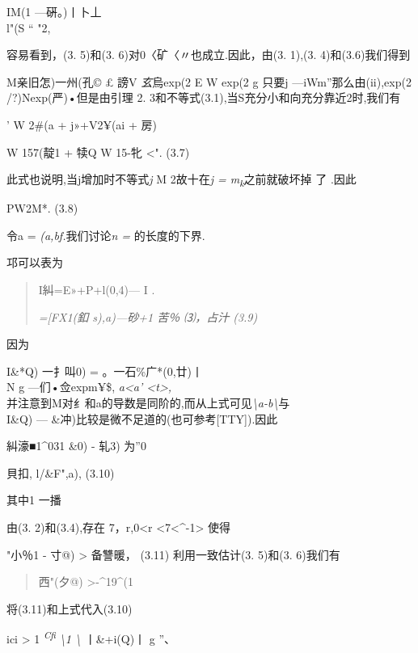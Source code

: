 {IM(1 ---硏。)丨}卜丄\\
l"(S `` "2,

容易看到，(3. 5)和(3. 6)对0〈矿〈〃也成立.因此，由(3. 1),(3.
4)和(3.6)我们得到

M亲旧怎)一州(孔©\textbar{} £ 謗V \emph{玄}烏exp(2 E W exp(2 g 只要j
---iWm''那么由(ii),exp(2 /?)Nexp(严)•但是由引理 2.
3和不等式(3.1),当S充分小和向充分靠近2时,我们有

' W 2\#(a + j»+V2¥(ai + 房)

W 157(靛1 + 犊Q W 15-牝 \textless{}". (3.7)

此式也说明,当j增加时不等式\emph{j} M 2故十在\emph{j =
m\textsubscript{k}}之前就破坏掉 了 .因此

PW2M*. (3.8)

令a = \emph{(a,bf.}我们讨论\emph{n =} 的长度的下界.

邛可以表为

\begin{quote}
I糾=\textbar{}E»+P+l(0,4)--- I .

\emph{={[}FX1(釦 s),a)---砂+1 苦％ ⑶，占汁 (3.9)}
\end{quote}

因为

I\&*Q) 一扌叫0)\textbar{} =
\textbar{}。一石\textbar{}\textbar{}\%广*(0,廿)丨\\
N g ---们•佥expm¥\$, \emph{a\textless{}a' \textless{}t\textgreater{},\\
}并注意到M对纟和a的导数是同阶的,而从上式可见\emph{\textbackslash{}a-b\textbackslash{}}与\\
I\&Q) --- \&冲)\textbar{}比较是微不足道的(也可参考{[}TTY{]}).因此

\textbar{}糾濠■1\^{}031 \textbar{}\&0) - 轧3)\textbar{} \textbar{}为''0
\textbar{}

貝扣, l/\&F",a)\textbar{}, (3.10)

其中1 一播

由(3. 2)和(3.4),存在 7，r,0\textless{}r
\textless{}7\textless{}\^{}-1\textgreater{} 使得

"\textbar{}小％1 - 寸@) \textbar{} \textgreater{} 备讐暖， (3.11)
利用一致估计(3. 5)和(3. 6)我们有

\begin{quote}
\textbar{}西"(夕@)\textbar{} \textgreater{}-\^{}19\^{}(1
\end{quote}

将(3.11)和上式代入(3.10)

ici \textgreater{} 1 \emph{\textsuperscript{Cfi} \textbackslash{}1
\textbackslash{}} {丨\&+i(Q)丨} g ''、

